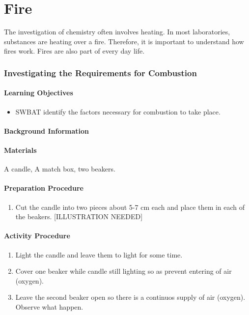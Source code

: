 \chapter{Fire}

The investigation of chemistry often involves heating. In most laboratories, substances are heating over a fire. Therefore, it is important to understand how fires work. Fires are also part of every day life.

\subsection{Investigating the Requirements for Combustion}

\subsubsection*{Learning Objectives}
\begin{itemize}
\item{SWBAT identify the factors necessary for combustion to take place.}
\end{itemize}

\subsubsection*{Background Information}


\subsubsection*{Materials}
A candle, A match box, two beakers.

\subsubsection*{Preparation Procedure}
\begin{enumerate}
\item{Cut the candle into two pieces about 5-7 cm each and place them in each of the beakers. [ILLUSTRATION NEEDED]}
\end{enumerate}

\subsubsection*{Activity Procedure}
\begin{enumerate}
\item{Light the candle and leave them to light for some time.}
\item{Cover one beaker while candle still lighting so as prevent entering of air (oxygen).}
\item{Leave the second beaker open so there is a continuos supply of air (oxygen). Observe what happen.}
\end{enumerate}

